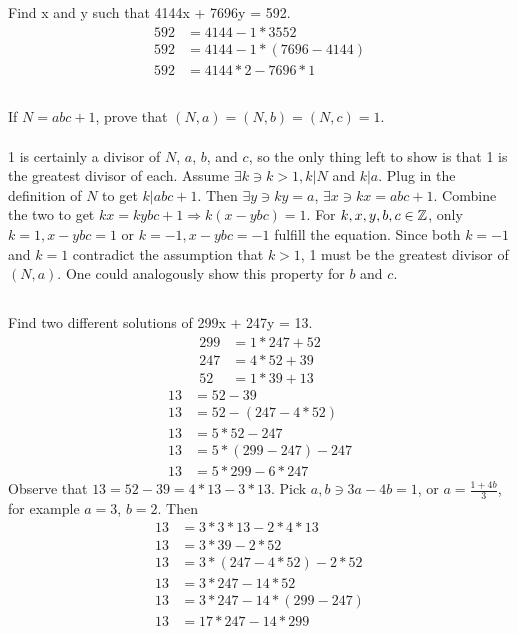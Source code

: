 \documentclass{article}
\begin{document}
\subsection{}
Find x and y such that 4144x + 7696y = 592.
\begin{align}
  592 &= 4144 - 1 * 3552 \\
  592 &= 4144 - 1 * (7696 - 4144) \\
  592 &= 4144 * 2 - 7696 * 1
\end{align}

\subsection{}
If $N = abc + 1$, prove that $(N, a) = (N, b) = (N, c) = 1$. \\~\\
1 is certainly a divisor of $N$, $a$, $b$, and $c$, so the only thing left to show
is that 1 is the greatest divisor of each.
Assume $\exists k \ni k > 1, k|N$ and $k|a$.
Plug in the definition of $N$ to get $k|abc + 1$.
Then $\exists y \ni ky =a$, $\exists x \ni kx = abc + 1$.
Combine the two to get $kx = kybc + 1 \Rightarrow k(x - ybc) = 1$.
For $k, x, y, b, c \in \mathbb{Z}$, only $k = 1, x - ybc = 1$ or $k = -1, x - ybc = -1$
fulfill the equation.
Since both $k = -1$ and $k = 1$ contradict the assumption that $k > 1$,
1 must be the greatest divisor of $(N, a)$.
One could analogously show this property for $b$ and $c$.

\subsection{}
Find two different solutions of 299x + 247y = 13.
\begin{align}
  299 &= 1 * 247 + 52  \\
  247 &= 4 * 52 + 39 \\
  52 &= 1 * 39 + 13
\end{align}
\begin{align}
  13 &= 52 - 39 \\
  13 &= 52 - (247 - 4 * 52) \\
  13 &= 5 * 52 - 247 \\
  13 &= 5 * (299 - 247) - 247 \\
  13 &= 5 * 299 - 6 * 247
\end{align}
Observe that $13 = 52 - 39 = 4 * 13 - 3 * 13$.
Pick $a, b \ni 3a - 4b = 1$, or $a = \frac{1 + 4b}{3}$, for example $a = 3$, $b = 2$.
Then
\begin{align}
  13 &= 3 * 3 * 13 - 2 * 4 * 13 \\
  13 &= 3 * 39 - 2 * 52 \\
  13 &= 3 * (247 - 4 * 52) - 2 * 52 \\
  13 &= 3 * 247 - 14 * 52 \\
  13 &= 3 * 247 - 14 * (299 - 247) \\
  13 &= 17 * 247 - 14 * 299 \\
\end{align}
\end{document}
